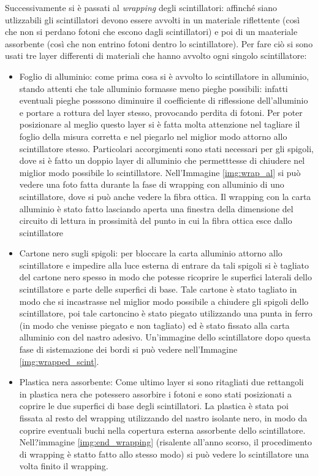 Successivamente si è passati al \textit{wrapping} degli scintillatori: affinché siano utlizzabili gli scintillatori devono essere  avvolti in un materiale riflettente
(così che non si perdano fotoni che escono dagli scintillatori) e poi di un maateriale assorbente (così che non entrino fotoni dentro lo scintillatore). Per fare
ciò si sono usati tre layer differenti di materiali che hanno avvolto ogni singolo scintillatore:
\begin{itemize}
\item Foglio di alluminio: come prima cosa si è avvolto lo scintillatore in alluminio, stando attenti che tale alluminio formasse meno pieghe possibili: infatti eventuali pieghe
posssono diminuire il coefficiente di riflessione dell'alluminio e portare a rottura del layer stesso, provocando perdita di fotoni. Per poter posizionare al meglio
questo layer si è fatta molta attenzione nel tagliare il foglio della misura corretta e nel piegarlo nel miglior  modo attorno allo scintillatore stesso. Particolari
accorgimenti sono stati necessari per gli spigoli, dove si è fatto un doppio layer di alluminio che permetttesse di chiudere nel miglior modo possibile lo
scintillatore. Nell'Immagine \ref{img:wrap_al} si può vedere una foto fatta durante la fase di wrapping con alluminio di uno scintillatore, dove si può anche vedere la fibra
ottica. Il wrapping con la carta alluminio è stato fatto lasciando aperta una finestra della dimensione del circuito di lettura in prossimità del punto in cui la fibra
ottica esce dallo scintillatore
\item Cartone nero sugli spigoli: per bloccare la carta alluminio attorno allo scintillatore e impedire alla luce esterna di entrare da tali spigoli si è tagliato del cartone
nero spesso in modo che potesse ricoprire le superfici laterali dello scintillatore e parte delle superfici di base. Tale cartone è stato tagliato in modo che si incastrasse
nel miglior modo possibile a chiudere gli spigoli dello scintillatore, poi tale cartoncino è stato piegato utilizzando una punta in ferro (in modo che venisse piegato
e non tagliato) ed è stato fissato alla carta alluminio con del nastro adesivo. Un'immagine dello scintillatore dopo questa fase di sistemazione dei bordi si può vedere
nell'Immagine \ref{img:wrapped_scint}.
\item Plastica nera assorbente: Come ultimo layer si sono ritagliati due rettangoli in plastica nera che potessero assorbire i fotoni e sono stati posizionati a coprire
le due superfici di base degli scintillatori. La plastica è stata poi fissata al resto del wrapping utilizzando del nastro isolante nero, in modo da coprire eventuali buchi
nella copertura esterna assorbente dello scintillatore. Nell?immagine \ref{img:end_wrapping} (risalente all'anno scorso, il procedimento di wrapping è statto fatto
allo stesso modo) si può vedere lo scintillatore una volta finito il wrapping.
\end{itemize}

